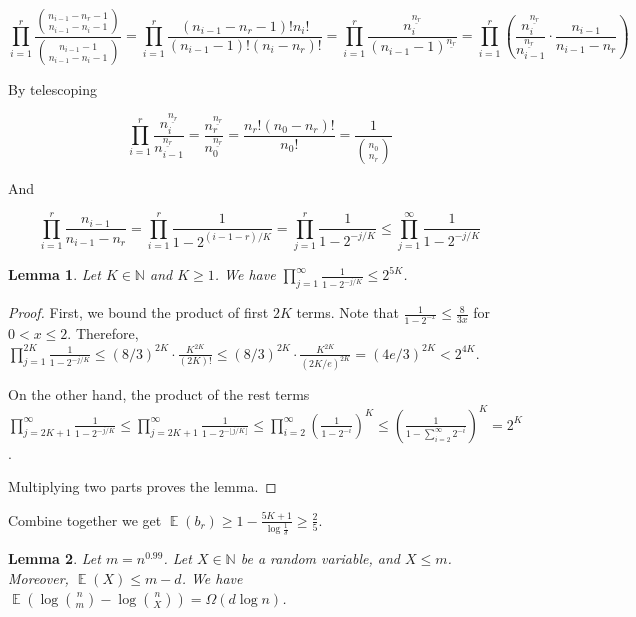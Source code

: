 \documentclass[10pt]{article}
\newtheorem{lemma}{Lemma}
\DeclareMathOperator*{\E}{\mathbb{E}}
\begin{document}
$$\prod_{i=1}^{r}{\frac{{n_{i-1}-n_r-1 \choose n_{i-1}-n_i-1}}{{n_{i-1}-1 \choose n_{i-1}-n_i-1}}}
=\prod_{i=1}^{r}\frac{(n_{i-1}-n_r-1)!n_i!}{(n_{i-1}-1)!(n_i-n_r)!}
=\prod_{i=1}^{r}\frac{n_i^{\underline{n_r}}}{(n_{i-1}-1)^{\underline{n_r}}}
=\prod_{i=1}^{r} \left( \frac{n_i^{\underline{n_r}}}{n_{i-1}^{\underline{n_r}}}\cdot \frac{n_{i-1}}{n_{i-1}-n_r} \right)$$ 

By telescoping 

$$\prod_{i=1}^{r} \frac{n_i^{\underline{n_r}}}{n_{i-1}^{\underline{n_r}}}
=\frac{n_r^{\underline{n_r}}}{n_0^{\underline{n_r}}}
=\frac{n_r!(n_0-n_r)!}{n_0!}=\frac{1}{{n_0 \choose n_r}}$$

And 

$$\prod_{i=1}^{r} \frac{n_{i-1}}{n_{i-1}-n_r}
=\prod_{i=1}^{r} \frac{1}{1-2^{(i-1-r)/K}}
=\prod_{j=1}^{r} \frac{1}{1-2^{-j/K}}
\le \prod_{j=1}^{\infty} \frac{1}{1-2^{-j/K}}$$


\begin{lemma}
  Let $K\in \mathbb{N}$ and $K\ge 1$. We have $\prod_{j=1}^{\infty} \frac{1}{1-2^{-j/K}}\le 2^{5K}$.
\end{lemma}

\begin{proof}
  First, we bound the product of first $2K$ terms. Note that $\frac{1}{1-2^{-x}}\le \frac{8}{3x}$ for $0<x\le 2$. Therefore, $\prod_{j=1}^{2K}\frac{1}{1-2^{-j/K}}\le (8/3)^{2K}\cdot \frac{K^{2K}}{(2K)!}\le (8/3)^{2K}\cdot \frac{K^{2K}}{(2K/e)^{2K}}= (4e/3)^{2K}< 2^{4K}$. 
  
  On the other hand, the product of the rest terms  $\prod_{j=2K+1}^{\infty}\frac{1}{1-2^{-j/K}} \le \prod_{j=2K+1}^{\infty}\frac{1}{1-2^{-\lfloor j/K \rfloor}} \le \prod_{i=2}^{\infty}\left( \frac{1}{1-2^{-i}}\right)^K \le \left( \frac{1}{1-\sum_{i=2}^{\infty}2^{-i}}\right)^K=2^K$.
  
  Multiplying two parts proves the lemma.
\end{proof}

Combine together we get $\E(b_r)\ge 1-\frac{5K+1}{\log \frac{1}{\delta}}\ge \frac{2}{5}$. 

\begin{lemma} \label{lemma:bits-saving}
  Let $m=n^{0.99}$. Let $X\in \mathbb{N}$ be a random variable, and $X\le m$. Moreover, $\E(X)\le m-d$. We have $\E(\log {n \choose m}-\log {n \choose X})=\Omega(d \log n)$.
\end{lemma}
\end{document}
